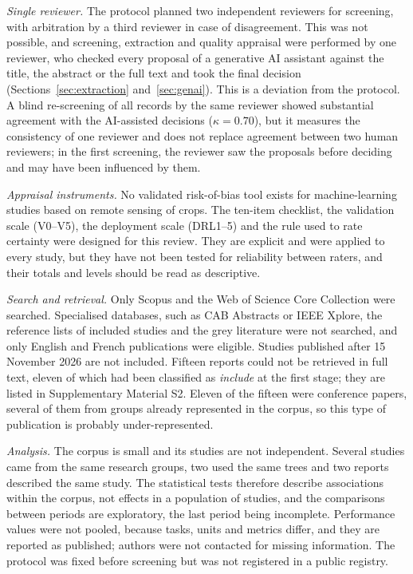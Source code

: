 \documentclass[preprint,12pt]{elsarticle}
\begin{document}
\textit{Single reviewer.} The protocol planned two independent reviewers for screening, with arbitration by a third reviewer in case of disagreement. This was not possible, and screening, extraction and quality appraisal were performed by one reviewer, who checked every proposal of a generative AI assistant against the title, the abstract or the full text and took the final decision (Sections~\ref{sec:extraction} and~\ref{sec:genai}). This is a deviation from the protocol. A blind re-screening of all records by the same reviewer showed substantial agreement with the AI-assisted decisions ($\kappa=0.70$), but it measures the consistency of one reviewer and does not replace agreement between two human reviewers; in the first screening, the reviewer saw the proposals before deciding and may have been influenced by them.

\textit{Appraisal instruments.} No validated risk-of-bias tool exists for machine-learning studies based on remote sensing of crops. The ten-item checklist, the validation scale (V0--V5), the deployment scale (DRL1--5) and the rule used to rate certainty were designed for this review. They are explicit and were applied to every study, but they have not been tested for reliability between raters, and their totals and levels should be read as descriptive.

\textit{Search and retrieval.} Only Scopus and the Web of Science Core Collection were searched. Specialised databases, such as CAB Abstracts or IEEE Xplore, the reference lists of included studies and the grey literature were not searched, and only English and French publications were eligible. Studies published after 15 November 2026 are not included. Fifteen reports could not be retrieved in full text, eleven of which had been classified as \emph{include} at the first stage; they are listed in Supplementary Material S2. Eleven of the fifteen were conference papers, several of them from groups already represented in the corpus, so this type of publication is probably under-represented.

\textit{Analysis.} The corpus is small and its studies are not independent. Several studies came from the same research groups, two used the same trees and two reports described the same study. The statistical tests therefore describe associations within the corpus, not effects in a population of studies, and the comparisons between periods are exploratory, the last period being incomplete. Performance values were not pooled, because tasks, units and metrics differ, and they are reported as published; authors were not contacted for missing information. The protocol was fixed before screening but was not registered in a public registry.
\end{document}

